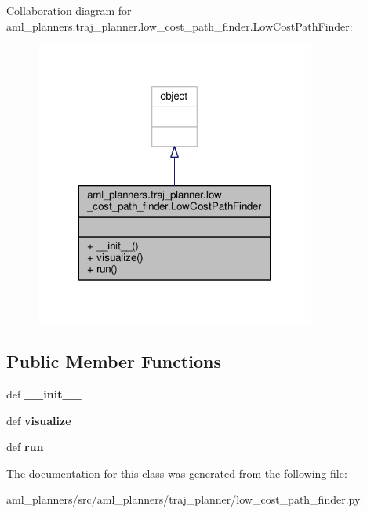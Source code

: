 Collaboration diagram for aml\-\_\-planners.\-traj\-\_\-planner.\-low\-\_\-cost\-\_\-path\-\_\-finder.\-Low\-Cost\-Path\-Finder\-:
\nopagebreak
\begin{figure}[H]
\begin{center}
\leavevmode
\includegraphics[width=262pt]{classaml__planners_1_1traj__planner_1_1low__cost__path__finder_1_1_low_cost_path_finder__coll__graph}
\end{center}
\end{figure}
\subsection*{Public Member Functions}
\begin{DoxyCompactItemize}
\item 
\hypertarget{classaml__planners_1_1traj__planner_1_1low__cost__path__finder_1_1_low_cost_path_finder_af0e5ed346e1fb712c09c1c4fe831ba5d}{def {\bfseries \-\_\-\-\_\-init\-\_\-\-\_\-}}\label{classaml__planners_1_1traj__planner_1_1low__cost__path__finder_1_1_low_cost_path_finder_af0e5ed346e1fb712c09c1c4fe831ba5d}

\item 
\hypertarget{classaml__planners_1_1traj__planner_1_1low__cost__path__finder_1_1_low_cost_path_finder_ab5571f904feff61d315e327fe91910c3}{def {\bfseries visualize}}\label{classaml__planners_1_1traj__planner_1_1low__cost__path__finder_1_1_low_cost_path_finder_ab5571f904feff61d315e327fe91910c3}

\item 
\hypertarget{classaml__planners_1_1traj__planner_1_1low__cost__path__finder_1_1_low_cost_path_finder_a9dd635ff498420ec099313d0f9825743}{def {\bfseries run}}\label{classaml__planners_1_1traj__planner_1_1low__cost__path__finder_1_1_low_cost_path_finder_a9dd635ff498420ec099313d0f9825743}

\end{DoxyCompactItemize}


The documentation for this class was generated from the following file\-:\begin{DoxyCompactItemize}
\item 
aml\-\_\-planners/src/aml\-\_\-planners/traj\-\_\-planner/low\-\_\-cost\-\_\-path\-\_\-finder.\-py\end{DoxyCompactItemize}
